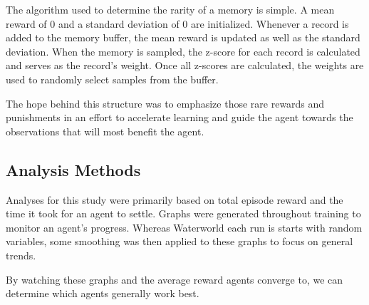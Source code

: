 The algorithm used to determine the rarity of a memory is simple.
A mean reward of 0 and a standard deviation of 0 are initialized.
Whenever a record is added to the memory buffer, the mean reward is updated as well as
the standard deviation.
When the memory is sampled, the z-score for each record is calculated and serves as
the record's weight.
Once all z-scores are calculated, the weights are used to randomly select samples
from the buffer.

The hope behind this structure was to emphasize those rare rewards and punishments in
an effort to accelerate learning and guide the agent towards the observations that
will most benefit the agent.

\subsection{Analysis Methods}\label{subsec:analysis-methods}
Analyses for this study were primarily based on total episode reward and the time it
took for an agent to settle.
Graphs were generated throughout training to monitor an agent's progress.
Whereas Waterworld each run is starts with random variables, some smoothing was then
applied to these graphs to focus on general trends.

By watching these graphs and the average reward agents converge to, we can determine
which agents generally work best.


